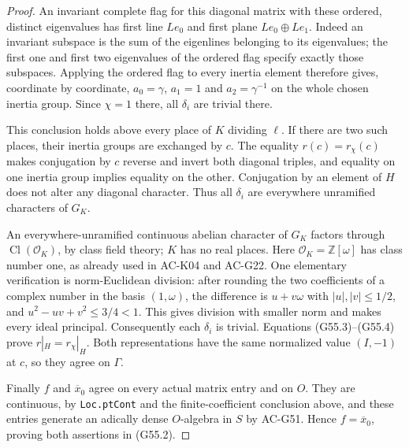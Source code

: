 \begin{proof}
An invariant complete flag for this diagonal matrix
with these ordered, distinct eigenvalues has first
line $Le_0$ and first plane $Le_0\oplus Le_1$.
Indeed an invariant subspace is the sum of the
eigenlines belonging to its eigenvalues; the first
one and first two eigenvalues of the ordered flag
specify exactly those subspaces.
Applying the ordered flag to every inertia element
therefore gives, coordinate by coordinate,
$a_0=\gamma$, $a_1=1$ and $a_2=\gamma^{-1}$ on the
whole chosen inertia group.
Since $\chi=1$ there, all $\delta_i$ are trivial
there.

This conclusion holds above every place of $K$
dividing $\ell$.  If there are two such places,
their inertia groups are exchanged by $c$.
The equality $r(c)=r_\chi(c)$ makes conjugation by
$c$ reverse and invert both diagonal triples,
and equality on one inertia group implies equality
on the other.  Conjugation by an element of $H$
does not alter any diagonal character.
Thus all $\delta_i$ are everywhere unramified
characters of $G_K$.

An everywhere-unramified continuous abelian
character of $G_K$ factors through
$\operatorname{Cl}(\mathcal O_K)$, by class field
theory; $K$ has no real places.
Here $\mathcal O_K=\mathbb Z[\omega]$ has class
number one, as already used in AC-K04 and AC-G22.
One elementary verification is norm-Euclidean
division: after rounding the two coefficients
of a complex number in the basis $(1,\omega)$,
the difference is $u+v\omega$ with
$|u|,|v|\le1/2$, and
$u^2-uv+v^2\le3/4<1$.
This gives division with smaller norm and makes
every ideal principal.
Consequently each $\delta_i$ is trivial.
Equations (G55.3)--(G55.4) prove $r|_H=r_\chi|_H$.
Both representations have the same normalized
value $(I,-1)$ at $c$, so they agree on $\Gamma$.

Finally $f$ and $\overline{x}_0$ agree on every
actual matrix entry and on $O$.
They are continuous, by \texttt{Loc.ptCont} and
the finite-coefficient conclusion above, and
these entries generate an adically dense
$O$-algebra in $S$ by AC-G51.
Hence $f=\overline{x}_0$, proving both assertions
in (G55.2).
\end{proof}

